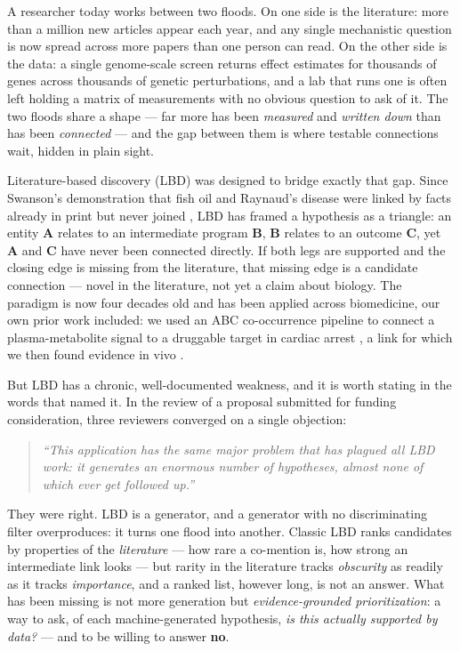 A researcher today works between two floods. On one side is the literature: more than a million new
articles appear each year, and any single mechanistic question is now spread across more papers than one
person can read. On the other side is the data: a single genome-scale screen returns effect estimates for
thousands of genes across thousands of genetic perturbations, and a lab that runs one is often left
holding a matrix of measurements with no obvious question to ask of it. The two floods share a shape ---
far more has been \emph{measured} and \emph{written down} than has been \emph{connected} --- and the gap between them is
where testable connections wait, hidden in plain sight.

Literature-based discovery (LBD) was designed to bridge exactly that gap. Since Swanson's demonstration
that fish oil and Raynaud's disease were linked by facts already in print but never joined \cite{swanson1986},
LBD has framed a hypothesis as a triangle: an entity \textbf{A} relates to an intermediate program \textbf{B}, \textbf{B}
relates to an outcome \textbf{C}, yet \textbf{A} and \textbf{C} have never been connected directly. If both legs are
supported and the closing edge is missing from the literature, that missing edge is a candidate
connection --- novel in the literature, not yet a claim about biology.
The paradigm is now four decades old and has been applied across biomedicine, our own prior work included:
we used an ABC co-occurrence pipeline to connect a plasma-metabolite signal to a druggable target in
cardiac arrest \cite{henry2021}, a link for which we then found evidence in vivo \cite{cheng2021}.

But LBD has a chronic, well-documented weakness, and it is worth stating in the words that named it. In
the review of a proposal submitted for funding consideration, three reviewers
converged on a single objection:

\begin{quote}
\emph{``This application has the same major problem that has plagued all LBD work: it generates an enormous
number of hypotheses, almost none of which ever get followed up.''}
\end{quote}

They were right. LBD is a generator, and a generator with no discriminating filter overproduces: it turns
one flood into another. Classic LBD ranks candidates by properties of the \emph{literature} --- how rare a
co-mention is, how strong an intermediate link looks --- but rarity in the literature tracks \emph{obscurity} as
readily as it tracks \emph{importance}, and a ranked list, however long, is not an answer. What has been
missing is not more generation but \emph{evidence-grounded prioritization}: a way to ask, of each
machine-generated hypothesis, \emph{is this actually supported by data?} --- and to be willing to answer \textbf{no}.

